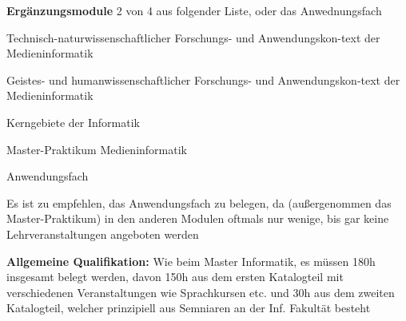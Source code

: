 \documentclass[a4paper,12pt]{report}
\begin{document}
\begin{itemize*}
	\item \textbf{Ergänzungsmodule} 2 von 4  aus folgender Liste, oder das Anwednungsfach
	\begin{itemize*}
		\item Technisch-naturwissenschaftlicher Forschungs- und Anwendungskon-text der Medieninformatik
		\item Geistes- und humanwissenschaftlicher Forschungs- und Anwendungskon-text der Medieninformatik
		\item Kerngebiete der Informatik
		\item Master-Praktikum Medieninformatik
		\item Anwendungsfach
	\end{itemize*}
	\item Es ist zu empfehlen, das Anwendungsfach zu belegen, da (außergenommen das Master-Praktikum) in den anderen Modulen oftmals nur wenige, bis gar keine Lehrveranstaltungen angeboten werden
	\item \textbf{Allgemeine Qualifikation:} Wie beim Master Informatik, es müssen 180h insgesamt belegt werden, davon 150h aus dem ersten Katalogteil mit verschiedenen Veranstaltungen wie Sprachkursen etc. und 30h aus dem zweiten Katalogteil, welcher prinzipiell aus Semniaren an der Inf. Fakultät besteht
\end{itemize*}
\end{document}
